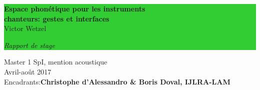 \colorbox{LimeGreen}{
	\parbox[t]{1.0\linewidth}{
		\centering \fontsize{35pt}{80pt}\selectfont %
		\vspace*{0.7cm} %
		
        
        \hfill \LARGE{\textbf{Espace phonétique pour les instruments\\ \hfill chanteurs: gestes et interfaces}} \\
 
 		\vspace{10pt}
		\hfill \Large{Victor Wetzel}\par
		\hfill \Large{\textit{Rapport de stage}}  
		\vspace*{0.7cm} %
	}
}

\vspace{70pt}

\vfill %


{\centering \large 
\hfill Master 1 SpI, mention acoustique\\
\hfill Avril-août 2017\\
\hfill Encadrants:\textbf{Christophe d'Alessandro \& Boris Doval, IJLRA-LAM}\\
}


\clearpage %
